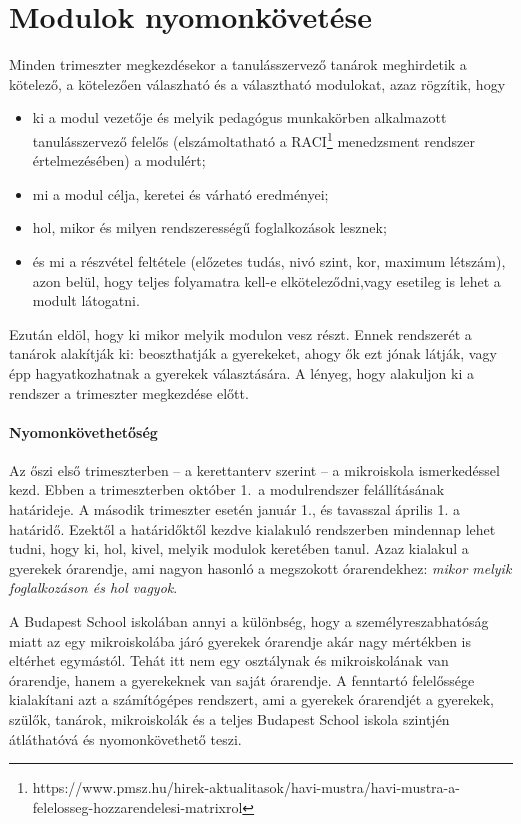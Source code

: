 \section{Modulok nyomonkövetése}
Minden trimeszter megkezdésekor a tanulásszervező tanárok meghirdetik a kötelező, a kötelezően válaszható és a választható modulokat, azaz rögzítik, hogy
\begin{itemize}
    \item ki a modul vezetője és melyik pedagógus munkakörben
      alkalmazott tanulásszervező felelős (elszámoltatható a
      RACI\footnote{https://www.pmsz.hu/hirek-aktualitasok/havi-mustra/havi-mustra-a-felelosseg-hozzarendelesi-matrixrol}
      menedzsment\linebreak
      rendszer értelmezésében) a modulért;
    \item mi a modul célja, keretei és várható eredményei;
    \item hol, mikor és milyen rendszerességű foglalkozások lesznek;
    \item és mi a részvétel feltétele (előzetes tudás, nivó szint,
      kor, maximum létszám), azon belül, hogy teljes folyamatra kell-e
      elköteleződni,\linebreak vagy esetileg is lehet a modult látogatni.
\end{itemize}
Ezután eldöl, hogy ki mikor  melyik modulon vesz részt. Ennek rendszerét a tanárok alakítják ki: beoszthatják a gyerekeket, ahogy ők ezt jónak látják, vagy épp hagyatkozhatnak a gyerekek választására. A lényeg, hogy alakuljon ki a rendszer a trimeszter megkezdése előtt.

\paragraph{Nyomonkövethetőség}
Az őszi első trimeszterben  -- a kerettanterv szerint -- a mikroiskola ismerkedéssel kezd. Ebben a trimeszterben október 1.~a modulrendszer felállításának határideje. A második trimeszter esetén január 1., és tavasszal április 1. a határidő. Ezektől a határidőktől kezdve kialakuló rendszerben mindennap lehet tudni, hogy ki, hol, kivel, melyik modulok keretében tanul. Azaz kialakul a gyerekek órarendje, ami nagyon hasonló a megszokott órarendekhez: \emph{mikor melyik foglalkozáson és hol vagyok}.

A Budapest School iskolában annyi a különbség, hogy a személyreszabhatóság miatt az egy mikroiskolába járó gyerekek órarendje akár nagy mértékben is eltérhet egymástól. Tehát itt nem egy osztálynak és mikroiskolának van órarendje, hanem a gyerekeknek van saját órarendje. A fenntartó felelőssége kialakítani azt a számítógépes rendszert, ami a gyerekek órarendjét a gyerekek, szülők, tanárok, mikroiskolák és a teljes Budapest School iskola szintjén átláthatóvá és nyomonkövethető teszi.


